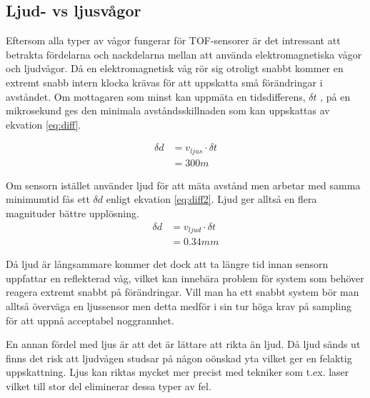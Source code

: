 \documentclass[a4paper,12pt,fleqn]{article}
\begin{document}
\subsection{Ljud- vs ljusvågor}
Eftersom alla typer av vågor fungerar för TOF-sensorer är det intressant att betrakta fördelarna och nackdelarna mellan att använda elektromagnetiska vågor och ljudvågor.
Då en elektromagnetisk våg rör sig otroligt snabbt kommer en extremt snabb intern klocka krävas för att uppskatta små förändringar i avståndet. Om mottagaren som minst kan uppmäta en tidsdifferens, \begin{math}\delta t\end{math} , på en mikrosekund ges den minimala avståndsskillnaden som kan uppskattas av ekvation \ref{eq:diff}.

\begin{equation}
\label{eq:diff}
\begin{split}
\delta d & = v_{ljus}\cdot\delta t \\
& = 300 m
\end{split}
\end{equation}

Om sensorn istället använder ljud för att mäta avstånd men arbetar med samma minimumtid fås ett \begin{math}\delta d\end{math} enligt ekvation \ref{eq:diff2}.
Ljud ger alltså en flera magnituder bättre upplösning.
\begin{equation}
\label{eq:diff2}
\begin{split}
\delta d & = v_{ljud}\cdot\delta t \\
& = 0.34 mm
\end{split}
\end{equation}

Då ljud är långsammare kommer det dock att ta längre tid innan sensorn uppfattar en reflekterad våg, vilket kan innebära problem för system som behöver reagera extremt snabbt på förändringar. Vill man ha ett snabbt system bör man alltså överväga en ljussensor men detta medför i sin tur höga krav på sampling för att uppnå acceptabel noggrannhet.

En annan fördel med ljus är att det är lättare att rikta än ljud. Då ljud sänds ut finns det risk att ljudvågen studsar på någon oönskad yta vilket ger en felaktig uppskattning.
Ljus kan riktas mycket mer precist med tekniker som t.ex. laser vilket till stor del eliminerar dessa typer av fel.
\end{document}

